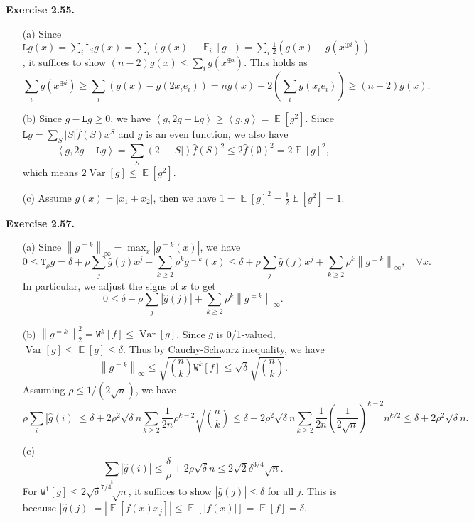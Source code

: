 \documentclass[a4paper]{article}
\newenvironment{exercise}[1]{
	\par
	\noindent\textbf{Exercise #1.}\quad
}{
	\par
	\bigskip
}
\DeclareMathOperator{\E}{\mathbb E}
\DeclareMathOperator{\Var}{\mathrm{Var}}
\newcommand{\abs}[1]{{\left| #1 \right|}}
\newcommand{\vabs}[1]{{\left\| #1 \right\|}}
\newcommand{\abra}[1]{{\left\langle #1 \right\rangle}}
\newcommand{\pbra}[1]{{\left( #1 \right)}}
\newcommand{\sbra}[1]{{\left[ #1 \right]}}
\newcommand{\Ltt}{\mathtt{L}}
\newcommand{\Wtt}{\mathtt{W}}
\newcommand{\Ttt}{\mathtt{T}}
\begin{document}
\begin{exercise}{2.55}
    \begin{itemize}
        \item[(a)] Since $\Ltt g(x)=\sum_i\Ltt_ig(x)=\sum_i\pbra{g(x)-\E_i[g]}=\sum_i\frac12\pbra{g(x)-g(x^{\oplus i})}$,
            it suffices to show $(n-2)g(x)\leq\sum_ig(x^{\oplus i})$. 
            This holds as
            $$
            \sum_ig(x^{\oplus i})\geq\sum_i\pbra{g(x)-g(2x_ie_i)}=ng(x)-2\pbra{\sum_ig(x_ie_i)}\geq(n-2)g(x).
            $$
        \item[(b)] Since $g-\Ltt g\geq0$, we have $\abra{g,2g-\Ltt g}\geq\abra{g,g}=\E[g^2]$.
            Since $\Ltt g=\sum_S|S|\hat f(S)x^S$ and $g$ is an even function, we also have
            $$
            \abra{g,2g-\Ltt g}=\sum_S(2-|S|)\hat f(S)^2\leq2\hat f(\emptyset)^2=2\E[g]^2,
            $$
            which means $2\Var[g]\leq\E[g^2]$.
        \item[(c)] Assume $g(x)=\abs{x_1+x_2}$, then we have $1=\E[g]^2=\frac12\E[g^2]=1$.
    \end{itemize}
\end{exercise}

\begin{exercise}{2.57}
    \begin{itemize}
        \item[(a)] Since $\vabs{g^{=k}}_\infty=\max_x\abs{g^{=k}(x)}$, we have
            $$
            0\leq\Ttt_\rho g=\delta+\rho\sum_j\hat g(j)x^j+\sum_{k\geq2}\rho^kg^{=k}(x)
            \leq\delta+\rho\sum_j\hat g(j)x^j+\sum_{k\geq2}\rho^k\vabs{g^{=k}}_\infty,\quad\forall x.
            $$
            In particular, we adjust the signs of $x$ to get
            $$
            0\leq\delta-\rho\sum_j\abs{\hat g(j)}+\sum_{k\geq2}\rho^k\vabs{g^{=k}}_\infty.
            $$
        \item[(b)] $\vabs{g^{=k}}_2^2=\Wtt^k[f]\leq\Var[g]$. Since $g$ is 0/1-valued, $\Var[g]\leq\E[g]\leq\delta$. 
            Thus by Cauchy-Schwarz inequality, we have
            $$
            \vabs{g^{=k}}_\infty\leq\sqrt{\binom nk\Wtt^k[f]}\leq\sqrt\delta\sqrt{\binom nk}.
            $$
            Assuming $\rho\leq1/(2\sqrt n)$, we have
            $$
            \rho\sum_i\abs{\hat g(i)}
            \leq\delta+2\rho^2\sqrt\delta n\sum_{k\ge2}\frac1{2n}\rho^{k-2}\sqrt{\binom nk}
            \leq\delta+2\rho^2\sqrt\delta n\sum_{k\ge2}\frac1{2n}\pbra{\frac1{2\sqrt n}}^{k-2}n^{k/2}
            \leq\delta+2\rho^2\sqrt\delta n.
            $$
        \item[(c)]
            $$
            \sum_i\abs{\hat g(i)}\leq\frac\delta\rho+2\rho\sqrt\delta n\leq2\sqrt2\delta^{3/4}\sqrt n.
            $$
            For $\Wtt^1[g]\leq2\sqrt\delta^{7/4}\sqrt n$, it suffices to show $\abs{\hat g(j)}\leq\delta$ for all $j$.
            This is because $\abs{\hat g(j)}=\abs{\E\sbra{f(x)x_j}}\leq\E\sbra{\abs{f(x)}}=\E[f]=\delta$.
    \end{itemize}
\end{exercise}
\end{document}
